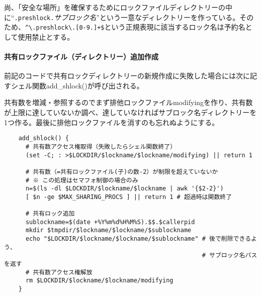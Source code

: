 尚、「安全な場所」を確保するためにロックファイルディレクトリーの中に``\verb|.preshlock.|\textit{サブロック名}''という一意なディレクトリーを作っている。そのため、\verb|^\.preshlock\.[0-9.]+$|という正規表現に該当するロック名は予約名として使用禁止とする。

\paragraph{共有ロックファイル（ディレクトリー）追加作成}
前記のコードで共有ロックディレクトリーの新規作成に失敗した場合には次に記すシェル関数add\_{}shlock()が呼び出される。

共有数を増減・参照するのでまず排他ロックファイルmodifyingを作り、共有数が上限に達していないか調べ、達していなければサブロック名ディレクトリーを1つ作る。最後に排他ロックファイルを消すのも忘れぬようにする。\\
\begin{frameboxit}{160.0mm}
\begin{verbatim}
	add_shlock() {
	  # 共有数アクセス権取得（失敗したらシェル関数終了）
	  (set -C; : >$LOCKDIR/$lockname/$lockname/modifying) || return 1

	  # 共有数（=共有ロックファイル(子)の数-2）が制限を超えていないか
	  # ※ この処理はセマフォ制御の場合のみ
	  n=$(ls -dl $LOCKDIR/$lockname/$lockname | awk '{$2-2}')
	  [ $n -ge $MAX_SHARING_PROCS ] || return 1 # 超過時は関数終了

	  # 共有ロック追加
	  sublockname=$(date +%Y%m%d%H%M%S).$$.$callerpid
	  mkdir $tmpdir/$lockname/$lockname/$sublockname
	  echo "$LOCKDIR/$lockname/$lockname/$sublockname" # 後で削除できるよう、
	                                                   # サブロック名パスを返す
	  # 共有数アクセス権解放
	  rm $LOCKDIR/$lockname/$lockname/modifying
	}
\end{verbatim}
\end{frameboxit}


